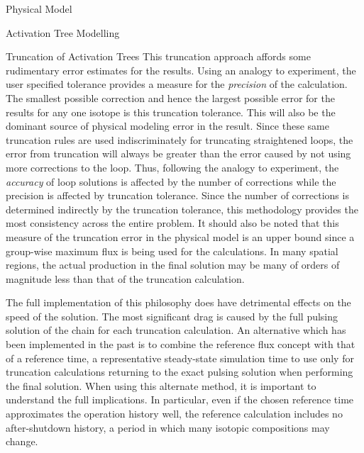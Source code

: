 \begin{chapter}{Physical Model\label{chap:physical}}
\begin{section}{Activation Tree Modelling\label{sec:physical.chains}}
\begin{subsection}{Truncation of Activation Trees}
    This truncation approach affords some rudimentary error estimates
    for the results.  Using an analogy to experiment, the user
    specified tolerance provides a measure for the \textsl{precision}
    of the calculation.  The smallest possible correction and hence
    the largest possible error for the results for any one isotope is
    this truncation tolerance.  This will also be the dominant source
    of physical modeling error in the result.  Since these same
    truncation rules are used indiscriminately for truncating
    straightened loops, the error from truncation will always be
    greater than the error caused by not using more corrections to the
    loop.  Thus, following the analogy to experiment, the
    \textsl{accuracy} of loop solutions is affected by the number of
    corrections while the precision is affected by truncation
    tolerance.  Since the number of corrections is determined
    indirectly by the truncation tolerance, this methodology provides
    the most consistency across the entire problem.  It should also be
    noted that this measure of the truncation error in the physical
    model is an upper bound since a group-wise maximum flux is being
    used for the calculations.  In many spatial regions, the actual
    production in the final solution may be many of orders of
    magnitude less than that of the truncation calculation.
    
    The full implementation of this philosophy does have detrimental
    effects on the speed of the solution.  The most significant drag
    is caused by the full pulsing solution of the chain for each
    truncation calculation.  An alternative which has been implemented
    in the past is to combine the reference flux concept with that of
    a reference time, a representative steady-state simulation time to
    use only for truncation calculations returning to the exact
    pulsing solution when performing the final solution.  When using
    this alternate method, it is important to understand the full
    implications.  In particular, even if the chosen reference time
    approximates the operation history well, the reference calculation
    includes no after-shutdown history, a period in which many
    isotopic compositions may change.
    

\end{subsection}
\end{section}
\end{chapter}
